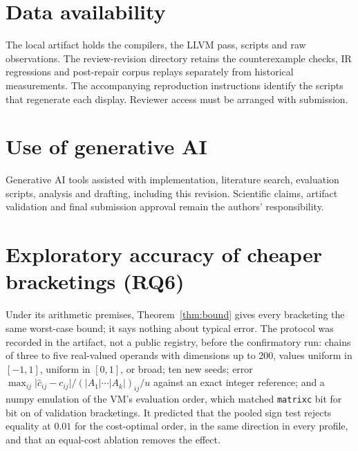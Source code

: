 \documentclass[acmsmall,review,anonymous,nonacm]{acmart}
\newcommand{\abs}[1]{\lvert #1\rvert}
\begin{document}
\section*{Data availability}
The local artifact holds the compilers, the LLVM pass, scripts and raw
observations. The review-revision directory retains the counterexample checks,
IR regressions and post-repair corpus replays separately from historical
measurements. The accompanying reproduction instructions identify the scripts
that regenerate each display. Reviewer access must be arranged with submission.

\section*{Use of generative AI}
Generative AI tools assisted with implementation, literature search,
evaluation scripts, analysis and drafting, including this revision. Scientific
claims, artifact validation and final submission approval remain the authors'
responsibility.

\appendix
\section{Exploratory accuracy of cheaper bracketings (RQ6)}\label{sec:rq6}
\begin{table}[htbp]
\caption{RQ6. Paired comparison of the cost-optimal and source bracketings on
real-valued chains, and the equal-cost ablation. Sign tests are two-sided and
exact; Holm-adjusted over the three confirmatory tests; median ratio of errors
(cost-optimal / source) with seed-cluster bootstrap 95\% intervals.}
\label{tab:accuracy}\centering\footnotesize
\end{table}
Under its arithmetic premises, Theorem~\ref{thm:bound} gives every bracketing
the same worst-case bound;
it says nothing about typical error. The protocol was recorded in the artifact,
not a public registry, before the confirmatory run: chains of three to five
real-valued operands with dimensions up to 200, values uniform in $[-1,1]$,
uniform in $[0,1]$, or broad; ten new seeds; error
$\max_{ij}\abs{\hat c_{ij}-c_{ij}}/(\abs{A_1}\cdots\abs{A_k})_{ij}/u$ against
an exact integer reference; and a numpy emulation of the VM's evaluation order,
which matched \texttt{matrixc} bit for bit on \RqSixValidated{} of
\RqSixValidations{} validation bracketings. It predicted that the pooled sign
test rejects equality at $0.01$ for the cost-optimal order, in the same
direction in every profile, and that an equal-cost ablation removes the effect.
\end{document}
